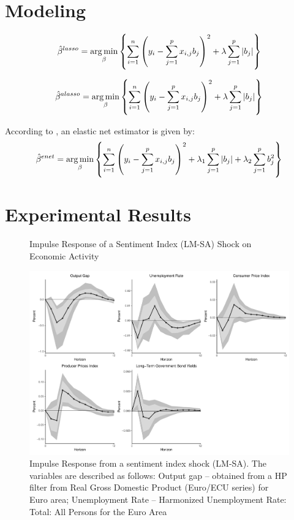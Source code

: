 \section{Modeling}

\begin{align} \label{eq:lasso}
    \hat{\beta}^{lasso} = \operatorname*{arg\,min}_{\beta} \left\{ \sum_{i=1}^{n} \left( y_i - \sum_{j=1}^p x_{i,j}b_j \right)^2 + \lambda \sum_{j=1}^p |b_j| \right\}
\end{align}

\begin{align} \label{eq:lassoadaptive}
    \hat{\beta}^{alasso} = \operatorname*{arg\,min}_{\beta} \left\{\sum_{i=1}^{n} \left( y_i - \sum_{j=1}^p x_{i,j}b_j \right)^2 + \lambda \sum_{j=1}^p |b_j| \right\}
\end{align}

According to \cite{zou2005regularization}, an elastic net estimator is given by:
\begin{align}\label{eq:elasticnet}
    \hat{\beta}^{enet} = \operatorname*{arg\,min}_{\beta} \left\{ \sum_{i=1}^{n} \left( y_i - \sum_{j=1}^p x_{i,j}b_j \right)^2 + \lambda_1 \sum_{j=1}^p |b_j| + \lambda_2 \sum_{j=1}^p b_j^2 \right\}
\end{align}






\section{Experimental Results}






\begin{figure}
    \centering
    \caption{Impulse Response of a Sentiment Index (LM-SA) Shock on Economic Activity}
    \includegraphics[width=\textwidth]{images/irf_lm.pdf}
    \caption*{Impulse Response from a sentiment index shock (LM-SA). The variables are described as follows: Output gap -- obtained from a HP filter from Real Gross Domestic Product (Euro/ECU series) for Euro area; Unemployment Rate -- Harmonized Unemployment Rate: Total: All Persons for the Euro Area}
    \label{fig:irflm}
\end{figure}


